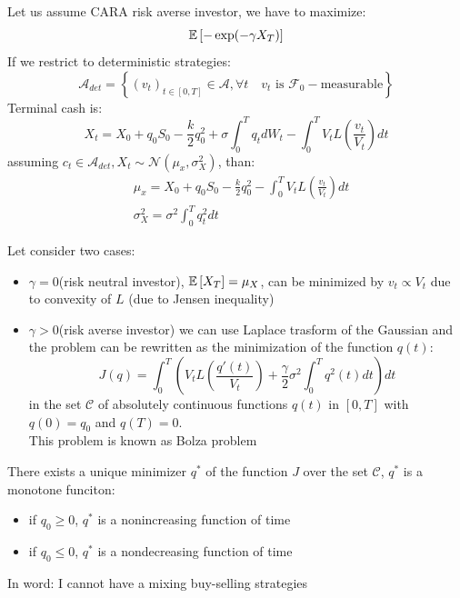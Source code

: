 \begin{mysetting}
	Let us assume CARA risk averse investor, we have to maximize:
	\[
	\mathbb{E}\left[-\exp(-\gamma X_T)\right]
	\]
If we restrict to deterministic strategies:
\[
\mathcal{A}_{det} = \left\{ (v_t)_{t \in [0,T]} \in \mathcal{A}, \forall t \quad v_t \text{ is } \mathcal{F}_0 - \text{measurable} \right\}
\]
Terminal cash is:
\[
X_t = X_0 + q_0S_0 - \frac{k}{2}q_0^2 + \sigma \int_{0}^{T}q_tdW_t - \int_{0}^{T}V_t L \left(\frac{v_t}{V_t}\right)dt
\]
assuming $c_t \in \mathcal{A}_{det}, X_t \sim \mathcal{N}(\mu_x,\sigma^2_X)$, than:
\begin{align*}
&\mu_x = X_0 + q_0S_0 - \frac{k}{2}q_0^2 - \int_{0}^{T} V_t L\left(\frac{v_t}{V_t}\right)dt\\
& \sigma_X^2 = \sigma^2 \int_{0}^{T} q^2_t dt
\end{align*}
\end{mysetting}
Let consider two cases:
\begin{itemize}
	\item $\gamma=0$(risk neutral investor), $\mathbb{E}\left[X_T\right] = \mu_X$, can be minimized by $v_t \propto V_t$ due to convexity of $L$ (due to Jensen inequality)
	\item $\gamma>0$(risk averse investor) we can use Laplace trasform of the Gaussian and the problem can be rewritten as the minimization of the function $q(t)$:
	\[
	J(q) = \int_{0}^{T} \left(V_tL\left(\frac{q'(t)}{V_t}\right) + \frac{\gamma}{2} \sigma^2 \int_0^T q^2(t) dt\right)dt
	\]
	in the set $\mathcal{C}$ of absolutely continuous functions $q(t)$ in $[0,T]$ with $q(0) =q_0$ and $q(T)=0$.\\
	This problem is known as Bolza problem
\end{itemize} 
\begin{mytheorem}
	There exists a unique minimizer $q^*$ of the function $J$ over the set $\mathcal{C}$, $q^*$ is a monotone funciton:
	\begin{itemize}
		\item if $q_0\geq 0$, $q^*$ is a nonincreasing function of time
		\item if $q_0\leq 0$, $q^*$ is a nondecreasing function of time
	\end{itemize}
In word: I cannot have a mixing buy-selling strategies
\end{mytheorem}
